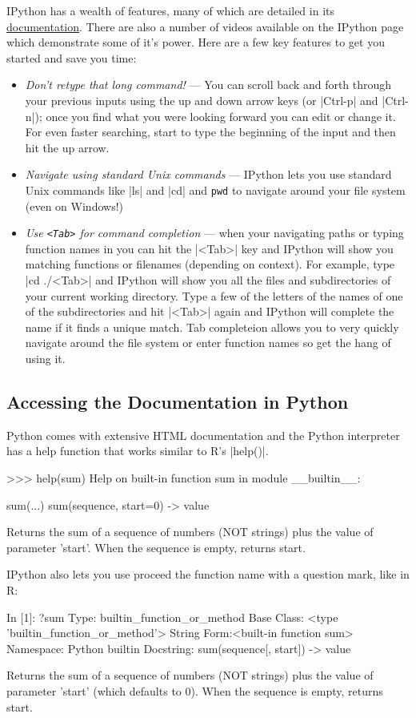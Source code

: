 IPython has a wealth of features, many of which are detailed in its
\href{http://ipython.org/documentation.html}{documentation}. There are
also a number of videos available on the IPython page which demonstrate
some of it's power. Here are a few key features to get you started and
save you time:

\begin{itemize}
\item
  \emph{Don't retype that long command!} --- You can scroll back and
  forth through your previous inputs using the up and down arrow keys
  (or |Ctrl-p| and |Ctrl-n|); once you find what you
  were looking forward you can edit or change it. For even faster
  searching, start to type the beginning of the input and then hit the
  up arrow.
\item
  \emph{Navigate using standard Unix commands} --- IPython lets you use
  standard Unix commands like |ls| and |cd| and
  \lstinline!pwd! to navigate around your file system (even on Windows!)
\item
  \emph{Use \texttt{<Tab>} for command completion} ---
  when your navigating paths or typing function names in you can hit the
  |<Tab>| key and IPython will show you matching functions or
  filenames (depending on context). For example, type
  |cd ./<Tab>| and IPython will show you all the files and
  subdirectories of your current working directory. Type a few of the
  letters of the names of one of the subdirectories and hit
  |<Tab>| again and IPython will complete the name if it finds
  a unique match. Tab completeion allows you to very quickly navigate
  around the file system or enter function names so get the hang of
  using it.
\end{itemize}


\subsection{Accessing the Documentation in Python}

Python comes with extensive HTML documentation and the Python
interpreter has a help function that works similar to R's
|help()|.
%
\begin{python}
>>> help(sum)
Help on built-in function sum in module __builtin__:

sum(...)
    sum(sequence, start=0) -> value

    Returns the sum of a sequence of numbers (NOT strings) plus the value
    of parameter 'start'.  When the sequence is empty, returns start.
\end{python}
%
IPython also lets you use proceed the function name with a question
mark, like in R:
%
\begin{python}
In [1]: ?sum
Type:       builtin_function_or_method
Base Class: <type 'builtin_function_or_method'>
String Form:<built-in function sum>
Namespace:  Python builtin
Docstring:
sum(sequence[, start]) -> value

Returns the sum of a sequence of numbers (NOT strings) plus the value
of parameter 'start' (which defaults to 0).  When the sequence is
empty, returns start.
\end{python}


